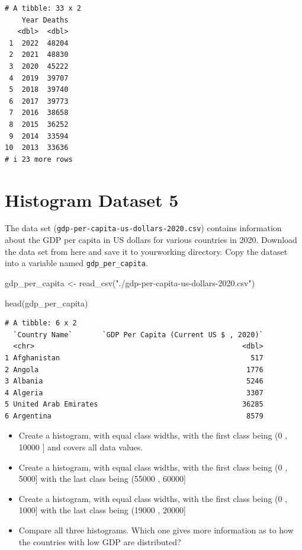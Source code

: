 \documentclass[
  letterpaper,
  DIV=11,
  numbers=noendperiod]{scrreprt}
\newenvironment{Shaded}{\begin{snugshade}}{\end{snugshade}}
\newcommand{\FunctionTok}[1]{\textcolor[rgb]{0.28,0.35,0.67}{#1}}
\newcommand{\NormalTok}[1]{\textcolor[rgb]{0.00,0.23,0.31}{#1}}
\newcommand{\OtherTok}[1]{\textcolor[rgb]{0.00,0.23,0.31}{#1}}
\newcommand{\StringTok}[1]{\textcolor[rgb]{0.13,0.47,0.30}{#1}}
\providecommand{\tightlist}{%
  \setlength{\itemsep}{0pt}\setlength{\parskip}{0pt}}\usepackage{longtable,booktabs,array}
\begin{document}
\begin{verbatim}
# A tibble: 33 x 2
    Year Deaths
   <dbl>  <dbl>
 1  2022  48204
 2  2021  48830
 3  2020  45222
 4  2019  39707
 5  2018  39740
 6  2017  39773
 7  2016  38658
 8  2015  36252
 9  2014  33594
10  2013  33636
# i 23 more rows
\end{verbatim}

\section*{Histogram Dataset 5}\label{histogram-dataset-5}


The data set (\texttt{gdp-per-capita-us-dollars-2020.csv}) contains
information about the GDP per capita in US dollars for various countries
in 2020. Download the data set from here and save it to yourworking
directory. Copy the dataset into a variable named
\texttt{gdp\_per\_capita}.

\begin{Shaded}
\begin{Highlighting}[]
\NormalTok{gdp\_per\_capita }\OtherTok{\textless{}{-}} \FunctionTok{read\_csv}\NormalTok{(}\StringTok{"./gdp{-}per{-}capita{-}us{-}dollars{-}2020.csv"}\NormalTok{)}

\FunctionTok{head}\NormalTok{(gdp\_per\_capita)}
\end{Highlighting}
\end{Shaded}

\begin{verbatim}
# A tibble: 6 x 2
  `Country Name`       `GDP Per Capita (Current US $ , 2020)`
  <chr>                                                 <dbl>
1 Afghanistan                                             517
2 Angola                                                 1776
3 Albania                                                5246
4 Algeria                                                3307
5 United Arab Emirates                                  36285
6 Argentina                                              8579
\end{verbatim}

\begin{itemize}
\tightlist
\item
  Create a histogram, with equal class widths, with the first class
  being (0 , 10000 {]} and covers all data values.
\item
  Create a histogram, with equal class widths, with the first class
  being (0 , 5000{]} with the last class being (55000 , 60000{]}
\item
  Create a histogram, with equal class widths, with the first class
  being (0 , 1000{]} with the last class being (19000 , 20000{]}
\item
  Compare all three histograms. Which one gives more information as to
  how the countries with low GDP are distributed?
\end{itemize}
\end{document}
